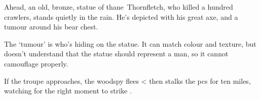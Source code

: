 \begin{boxtext}
  Ahead, an old, bronze, statue of \gls{thane}~Thornfletch, who killed a
  hundred \glspl{crawler}, stands quietly in the rain.  He's depicted with his
  great axe, and a tumour around his bear chest.
\end{boxtext}

The `tumour' is  who's hiding on the statue.
It can match colour and texture, but doesn't understand that the statue should represent a man, so it cannot camouflage properly.

If the troupe approaches,
the \gls{woodspy} flees%
\ifnum\value{r12}<\value{hp}%
  then stalks the \glspl{pc} for ten miles, watching for the right moment to strike%
\fi.%

\woodspy
